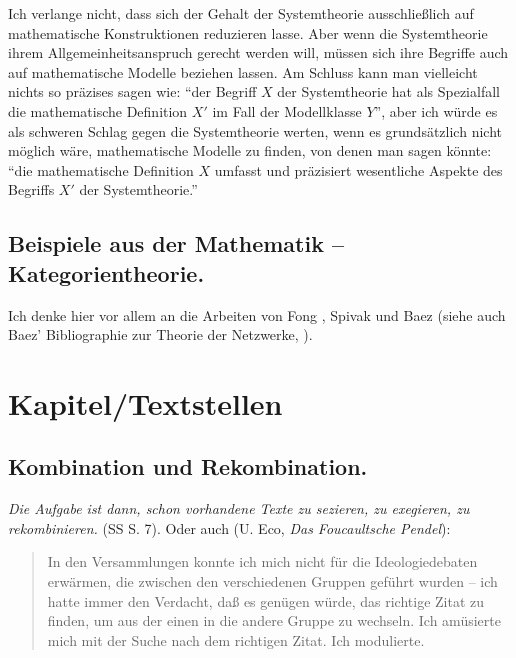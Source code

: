 \documentclass[a4paper, 10pt]{amsart}
\begin{document}
Ich verlange nicht, dass sich der Gehalt der Systemtheorie ausschließlich auf mathematische Konstruktionen reduzieren lasse. Aber wenn die Systemtheorie ihrem Allgemeinheitsanspruch gerecht werden will, müssen sich ihre Begriffe auch auf mathematische Modelle beziehen lassen. Am Schluss kann man vielleicht nichts so präzises sagen wie: ``der Begriff $X$ der Systemtheorie hat als Spezialfall die mathematische Definition $X'$ im Fall der Modellklasse $Y$'', aber ich würde es als schweren Schlag gegen die Systemtheorie werten, wenn es grundsätzlich nicht möglich wäre, mathematische Modelle zu finden, von denen man sagen könnte: ``die mathematische Definition $X$ umfasst und präzisiert wesentliche Aspekte des Begriffs $X'$ der Systemtheorie.''

\subsection{Beispiele aus der Mathematik -- Kategorientheorie.}
Ich denke hier vor allem an die Arbeiten von Fong \cite{fongCategoricalApproachOpen2016,fongAlgebraOpenInterconnected2016,fongBehavioralMereology2018}, Spivak \cite{spivakOperadWiringDiagrams2013} und Baez \cite{baezCategoriesControl2014} (siehe auch Baez' Bibliographie zur Theorie der Netzwerke, \cite{NetworkTheoryBaez}).
\section{Kapitel/Textstellen}
\subsection{Kombination und Rekombination.}
\emph{Die Aufgabe ist dann, schon vorhandene Texte zu sezieren, zu exegieren, zu rekombinieren.} (SS S. 7). Oder auch (U. Eco, \emph{Das Foucaultsche Pendel}):
\begin{quotation}
In den Versammlungen konnte ich mich nicht f\"ur die Ideologiedebaten erw\"armen, die zwischen den verschiedenen Gruppen gef\"uhrt wurden -- ich hatte immer den Verdacht, da{\ss} es gen\"ugen w\"urde, das richtige Zitat zu finden, um aus der einen in die andere Gruppe zu wechseln. Ich am\"usierte mich mit der Suche nach dem richtigen Zitat. Ich modulierte.
\end{quotation}
\end{document}
